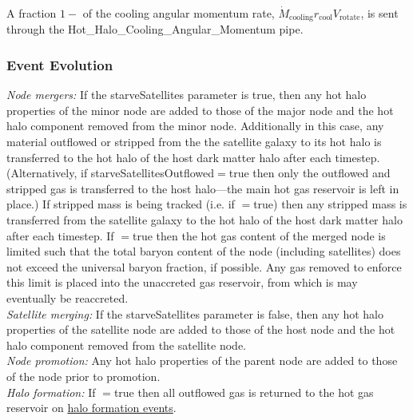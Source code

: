 A fraction $1-${\normalfont \ttfamily [hotHaloAngularMomentumLossFraction]} of the cooling angular momentum rate, $\dot{M}_\mathrm{cooling} r_\mathrm{cool} V_\mathrm{rotate}$, is sent through the {\normalfont \ttfamily Hot\_Halo\_Cooling\_Angular\_Momentum} pipe.

\subsubsection{Event Evolution}

\noindent\emph{Node mergers:} If the {\normalfont \ttfamily starveSatellites} parameter is true, then any hot halo properties of the minor \gls{node} are added to those of the major \gls{node} and the hot halo \gls{component} removed from the minor node. Additionally in this case, any material outflowed or stripped from the the satellite galaxy to its hot halo is transferred to the hot halo of the host dark matter halo after each timestep. (Alternatively, if {\normalfont \ttfamily starveSatellitesOutflowed}$=${\normalfont \ttfamily true} then only the outflowed and stripped gas is transferred to the host halo---the main hot gas reservoir is left in place.) If stripped mass is being tracked (i.e. if {\normalfont \ttfamily [hotHaloTrackStrippedGas]}$=${\normalfont \ttfamily true}) then any stripped mass is transferred from the satellite galaxy to the hot halo of the host dark matter halo after each timestep. If {\normalfont \ttfamily [hotHaloNodeMergerLimitBaryonFraction]}$=${\normalfont \ttfamily true} then the hot gas content of the merged node is limited such that the total baryon content of the node (including satellites) does not exceed the universal baryon fraction, if possible. Any gas removed to enforce this limit is placed into the unaccreted gas reservoir, from which is may eventually be reaccreted.\\

\noindent\emph{Satellite merging:} If the {\normalfont \ttfamily starveSatellites} parameter is false, then any hot halo properties of the satellite \gls{node} are added to those of the host \gls{node} and the hot halo \gls{component} removed from the satellite node.\\

\noindent\emph{Node promotion:} Any hot halo properties of the parent \gls{node} are added to those of the \gls{node} prior to promotion.\\

\noindent\emph{Halo formation:} If {\normalfont \ttfamily [hotHaloOutflowReturnOnFormation]}$=${\normalfont \ttfamily true} then all outflowed gas is returned to the hot gas reservoir on \href{https://github.com/galacticusorg/galacticus/releases/download/masterRelease/Galacticus_Development.pdf\#sec.HaloFormationEvents}{halo formation events}.\\

